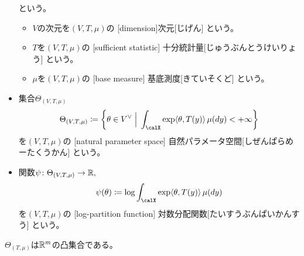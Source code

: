 \documentclass[report]{jlreq}
\begin{document}
\begin{definition}[指数型分布族]
\begin{itemize}
            という。
            \begin{itemize}
                \item $V$の次元を$(V, T, \mu)$の
                    [dimension]{次元}[じげん]
                    という。
                \item $T$を$(V, T, \mu)$の
                    [sufficient statistic]
                    {十分統計量}[じゅうぶんとうけいりょう]
                    という。
                \item $\mu$を$(V, T, \mu)$の
                    [base measure]
                    {基底測度}[きていそくど]
                    という。
            \end{itemize}
        \item 集合$\Theta_{(V, T, \mu)}$
            \begin{equation}
                \Theta_{(V, T, \mu)}
                    \coloneqq \mybrace{
                        \theta \in V^\vee
                        \;\Big|\;
                        \int_\calX \exp \langle \theta, T(y) \rangle \, \mu(dy) < +\infty
                    }
            \end{equation}
            を$(V, T, \mu)$の
            [natural parameter space]
            {自然パラメータ空間}[しぜんぱらめーたくうかん]
            という。
        \item 関数$\psi \colon \Theta_{(V, T, \mu)} \to \mathbb{R},$
            \begin{equation}
                \psi(\theta)
                    \coloneqq
                    \log \int_\calX \exp \langle \theta, T(y) \rangle \, \mu(dy)
            \end{equation}
            を$(V, T, \mu)$の
            [log-partition function]
            {対数分配関数}[たいすうぶんぱいかんすう]
            という。
    \end{itemize}
\end{definition}

\begin{proposition}[自然パラメータ空間は凸集合]
    $\Theta_{(T, \mu)}$は$\mathbb{R}^m$の凸集合である。
\end{proposition}
\end{document}
